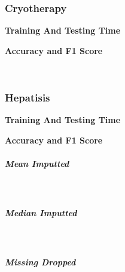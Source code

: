 \documentclass[11pt]{article}
\begin{document}
    \hypertarget{cryotherapy}{%
\subsubsection{Cryotherapy}\label{cryotherapy}}

    \textbf{Training And Testing Time}

    

    \textbf{Accuracy and F1 Score}

    \begin{center}
    \end{center}
    { \hspace*{\fill} \\}
    
    \hypertarget{hepatisis}{%
\subsubsection{Hepatisis}\label{hepatisis}}

    \textbf{Training And Testing Time}

    

    \textbf{Accuracy and F1 Score}

    \hypertarget{mean-imputted}{%
\subparagraph{Mean Imputted}\label{mean-imputted}}

    \begin{center}
    \end{center}
    { \hspace*{\fill} \\}
    
    \hypertarget{median-imputted}{%
\subparagraph{Median Imputted}\label{median-imputted}}

    \begin{center}
    \end{center}
    { \hspace*{\fill} \\}
    
    \hypertarget{missing-dropped}{%
\subparagraph{Missing Dropped}\label{missing-dropped}}

    \begin{center}
    \end{center}
    { \hspace*{\fill} \\}
    
\end{document}
